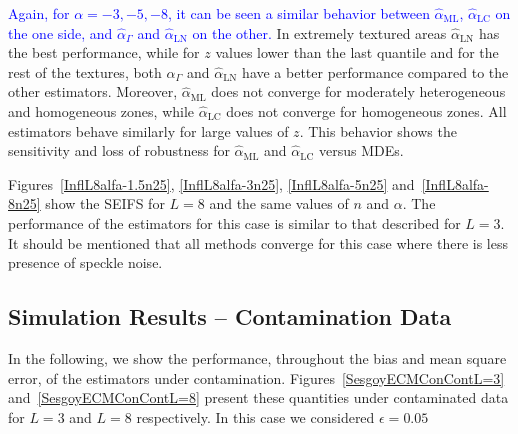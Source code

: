 \documentclass[twocolumn]{svjour3}
\begin{document}
\textcolor{blue}{Again, for $\alpha=-3, -5, -8$, it can be seen a similar behavior between $\widehat{\alpha}_{\text{{ML}}}$, $\widehat{\alpha}_{\text{{LC}}}$ on the one side, and $\widehat{\alpha}_{\Gamma}$ and $\widehat{\alpha}_{\text{{LN}}}$ on the other. }
	In extremely textured areas $\widehat{\alpha}_{\text{{LN}}}$ has the best performance, while for $z$ values lower than the last quantile and for the rest of the textures, both $\widehat{\alpha}_{\Gamma}$ and $\widehat{\alpha}_{\text{{LN}}}$ have a better performance compared to the other estimators. 
	Moreover, $\widehat{\alpha}_{\text{{ML}}}$ does not converge for moderately heterogeneous and homogeneous zones, while $\widehat{\alpha}_{\text{{LC}}}$ does not converge for homogeneous zones. All estimators behave similarly for large values of $z$. 
	This behavior shows the sensitivity and loss of robustness for $\widehat{\alpha}_{\text{{ML}}}$ and $\widehat{\alpha}_{\text{{LC}}}$ versus MDEs.
	
	Figures~\ref{InflL8alfa-1.5n25}, \ref{InflL8alfa-3n25}, \ref{InflL8alfa-5n25} and~\ref{InflL8alfa-8n25} show the SEIFS for $L=8$ and the same values of $n$ and $\alpha$. 
	The performance of the estimators for this case is similar to that described for $L=3$. 
	It should be mentioned that all methods converge for this case where there is less presence of speckle noise.
	
	
	\subsection{Simulation Results -- Contamination Data}
	\label{CasesCont}
	
	In the following, we show the performance, throughout the bias and mean square error, of the estimators under contamination. 
	Figures~\ref{SesgoyECMConContL=3} and~\ref{SesgoyECMConContL=8} present these quantities under contaminated data for $L=3$ and $L=8$ respectively. In this case we considered $\epsilon=0.05$
	
\end{document}
